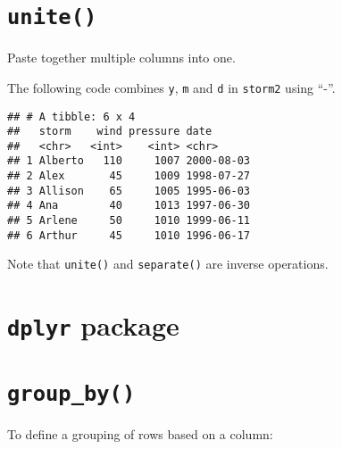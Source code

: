 \documentclass[]{article}
\newenvironment{Shaded}{\begin{snugshade}}{\end{snugshade}}
\newcommand{\DataTypeTok}[1]{\textcolor[rgb]{0.13,0.29,0.53}{#1}}
\newcommand{\DecValTok}[1]{\textcolor[rgb]{0.00,0.00,0.81}{#1}}
\newcommand{\KeywordTok}[1]{\textcolor[rgb]{0.13,0.29,0.53}{\textbf{#1}}}
\newcommand{\NormalTok}[1]{#1}
\newcommand{\OperatorTok}[1]{\textcolor[rgb]{0.81,0.36,0.00}{\textbf{#1}}}
\newcommand{\StringTok}[1]{\textcolor[rgb]{0.31,0.60,0.02}{#1}}
\begin{document}
\hypertarget{unite}{%
\section{\texorpdfstring{\texttt{unite()}}{unite()}}\label{unite}}

Paste together multiple columns into one.

The following code combines \texttt{y}, \texttt{m} and \texttt{d} in
\texttt{storm2} using ``-''.

\begin{Shaded}
\end{Shaded}

\begin{verbatim}
## # A tibble: 6 x 4
##   storm    wind pressure date      
##   <chr>   <int>    <int> <chr>     
## 1 Alberto   110     1007 2000-08-03
## 2 Alex       45     1009 1998-07-27
## 3 Allison    65     1005 1995-06-03
## 4 Ana        40     1013 1997-06-30
## 5 Arlene     50     1010 1999-06-11
## 6 Arthur     45     1010 1996-06-17
\end{verbatim}

Note that \texttt{unite()} and \texttt{separate()} are inverse
operations.

\hypertarget{dplyr-package}{%
\section{\texorpdfstring{\texttt{dplyr}
package}{dplyr package}}\label{dplyr-package}}

\hypertarget{group_by}{%
\section{\texorpdfstring{\texttt{group\_by()}}{group\_by()}}\label{group_by}}

To define a grouping of rows based on a column:

\begin{Shaded}
\end{Shaded}
\end{document}
